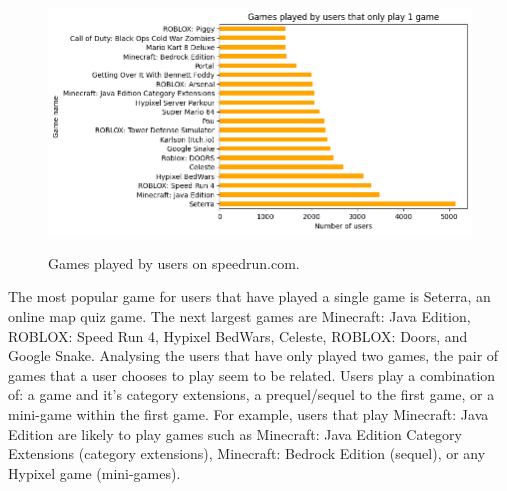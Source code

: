 \begin{figure}[h]
    \centering
    \includegraphics[width=0.7\linewidth]{images/user_onegame_preference.png}
    \label{fig:figure1}
    \caption{Games played by users on speedrun.com.}
\end{figure}

The most popular game for users that have played a single game is Seterra, an online map quiz game. The next largest games are Minecraft: Java Edition, ROBLOX: Speed Run 4, Hypixel BedWars, Celeste, ROBLOX: Doors, and Google Snake. Analysing the users that have only played two games, the pair of games that a user chooses to play seem to be related. Users play a combination of: a game and it's category extensions, a prequel/sequel to the first game, or a mini-game within the first game. For example, users that play Minecraft: Java Edition are likely to play games such as Minecraft: Java Edition Category Extensions (category extensions), Minecraft: Bedrock Edition (sequel), or any Hypixel game (mini-games). 

